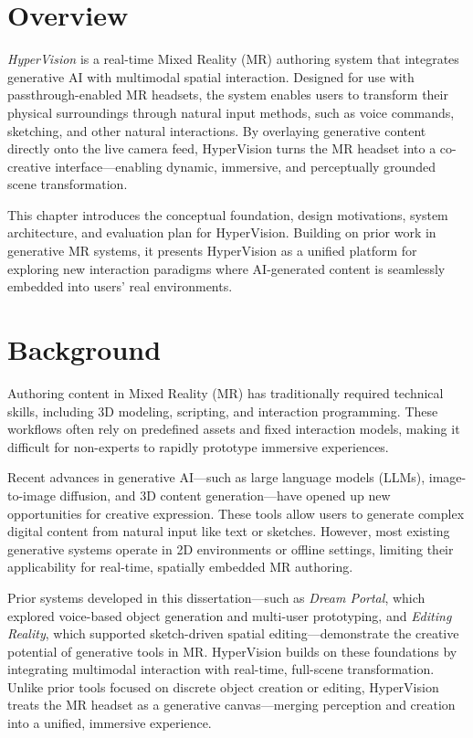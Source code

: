 \section{Overview}
\textit{HyperVision} is a real-time Mixed Reality (MR) authoring system that integrates generative AI with multimodal spatial interaction. Designed for use with passthrough-enabled MR headsets, the system enables users to transform their physical surroundings through natural input methods, such as voice commands, sketching, and other natural interactions. By overlaying generative content directly onto the live camera feed, HyperVision turns the MR headset into a co-creative interface—enabling dynamic, immersive, and perceptually grounded scene transformation.

This chapter introduces the conceptual foundation, design motivations, system architecture, and evaluation plan for HyperVision. Building on prior work in generative MR systems, it presents HyperVision as a unified platform for exploring new interaction paradigms where AI-generated content is seamlessly embedded into users’ real environments.


 \section{Background} %
Authoring content in Mixed Reality (MR) has traditionally required technical skills, including 3D modeling, scripting, and interaction programming. These workflows often rely on predefined assets and fixed interaction models, making it difficult for non-experts to rapidly prototype immersive experiences.

Recent advances in generative AI—such as large language models (LLMs), image-to-image diffusion, and 3D content generation—have opened up new opportunities for creative expression. These tools allow users to generate complex digital content from natural input like text or sketches. However, most existing generative systems operate in 2D environments or offline settings, limiting their applicability for real-time, spatially embedded MR authoring.

Prior systems developed in this dissertation—such as \textit{Dream Portal}, which explored voice-based object generation and multi-user prototyping, and \textit{Editing Reality}, which supported sketch-driven spatial editing—demonstrate the creative potential of generative tools in MR. HyperVision builds on these foundations by integrating multimodal interaction with real-time, full-scene transformation. Unlike prior tools focused on discrete object creation or editing, HyperVision treats the MR headset as a generative canvas—merging perception and creation into a unified, immersive experience.




